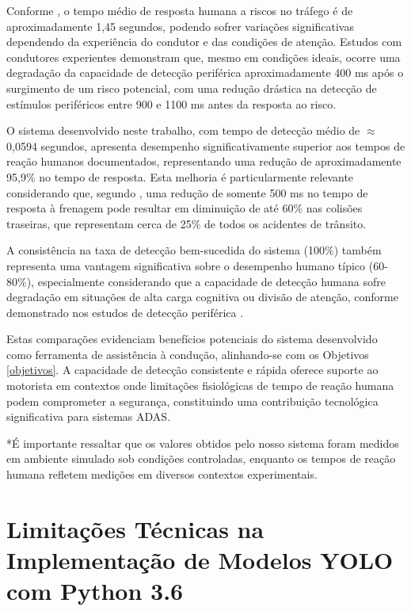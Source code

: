Conforme , o tempo médio de resposta humana a riscos no tráfego é de aproximadamente 1,45 segundos, podendo sofrer variações significativas dependendo da experiência do condutor e das condições de atenção. Estudos com condutores experientes demonstram que, mesmo em condições ideais, ocorre uma degradação da capacidade de detecção periférica aproximadamente 400 ms após o surgimento de um risco potencial, com uma redução drástica na detecção de estímulos periféricos entre 900 e 1100 ms antes da resposta ao risco.

O sistema desenvolvido neste trabalho, com tempo de detecção médio de $\approx$0,0594 segundos, apresenta desempenho significativamente superior aos tempos de reação humanos documentados, representando uma redução de aproximadamente 95,9\% no tempo de resposta. Esta melhoria é particularmente relevante considerando que, segundo , uma redução de somente 500 ms no tempo de resposta à frenagem pode resultar em diminuição de até 60\% nas colisões traseiras, que representam cerca de 25\% de todos os acidentes de trânsito.

A consistência na taxa de detecção bem-sucedida do sistema (100\%) também representa uma vantagem significativa sobre o desempenho humano típico (60-80\%), especialmente considerando que a capacidade de detecção humana sofre degradação em situações de alta carga cognitiva ou divisão de atenção, conforme demonstrado nos estudos de detecção periférica .

Estas comparações evidenciam benefícios potenciais do sistema desenvolvido como ferramenta de assistência à condução, alinhando-se com os Objetivos \ref{objetivos}. A capacidade de detecção consistente e rápida oferece suporte ao motorista em contextos onde limitações fisiológicas de tempo de reação humana podem comprometer a segurança, constituindo uma contribuição tecnológica significativa para sistemas ADAS.

*É importante ressaltar que os valores obtidos pelo nosso sistema foram medidos em ambiente simulado sob condições controladas, enquanto os tempos de reação humana refletem medições em diversos contextos experimentais.


\section{Limitações Técnicas na Implementação de Modelos YOLO com Python 3.6} \label{subsec:limitacoes_tecnicas}

